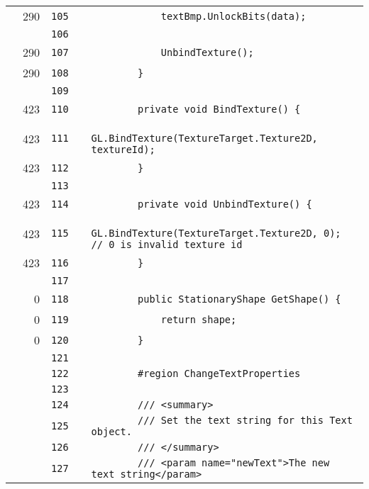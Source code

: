 \documentclass[a4paper,landscape,10pt]{article}
\begin{document}
\begin{longtable}[l]{lrrll}
\cellcolor{green} & 290 & \verb~105~ & & \verb~            textBmp.UnlockBits(data);~\\
\cellcolor{gray} &  & \verb~106~ & & \verb~~\\
\cellcolor{green} & 290 & \verb~107~ & & \verb~            UnbindTexture();~\\
\cellcolor{green} & 290 & \verb~108~ & & \verb~        }~\\
\cellcolor{gray} &  & \verb~109~ & & \verb~~\\
\cellcolor{green} & 423 & \verb~110~ & & \verb~        private void BindTexture() {~\\
\cellcolor{green} & 423 & \verb~111~ & & \verb~            GL.BindTexture(TextureTarget.Texture2D, textureId);~\\
\cellcolor{green} & 423 & \verb~112~ & & \verb~        }~\\
\cellcolor{gray} &  & \verb~113~ & & \verb~~\\
\cellcolor{green} & 423 & \verb~114~ & & \verb~        private void UnbindTexture() {~\\
\cellcolor{green} & 423 & \verb~115~ & & \verb~            GL.BindTexture(TextureTarget.Texture2D, 0); // 0 is invalid texture id~\\
\cellcolor{green} & 423 & \verb~116~ & & \verb~        }~\\
\cellcolor{gray} &  & \verb~117~ & & \verb~~\\
\cellcolor{red} & 0 & \verb~118~ & & \verb~        public StationaryShape GetShape() {~\\
\cellcolor{red} & 0 & \verb~119~ & & \verb~            return shape;~\\
\cellcolor{red} & 0 & \verb~120~ & & \verb~        }~\\
\cellcolor{gray} &  & \verb~121~ & & \verb~~\\
\cellcolor{gray} &  & \verb~122~ & & \verb~        #region ChangeTextProperties~\\
\cellcolor{gray} &  & \verb~123~ & & \verb~~\\
\cellcolor{gray} &  & \verb~124~ & & \verb~        /// <summary>~\\
\cellcolor{gray} &  & \verb~125~ & & \verb~        /// Set the text string for this Text object.~\\
\cellcolor{gray} &  & \verb~126~ & & \verb~        /// </summary>~\\
\cellcolor{gray} &  & \verb~127~ & & \verb~        /// <param name="newText">The new text string</param>~\\

\end{longtable}
\end{document}
